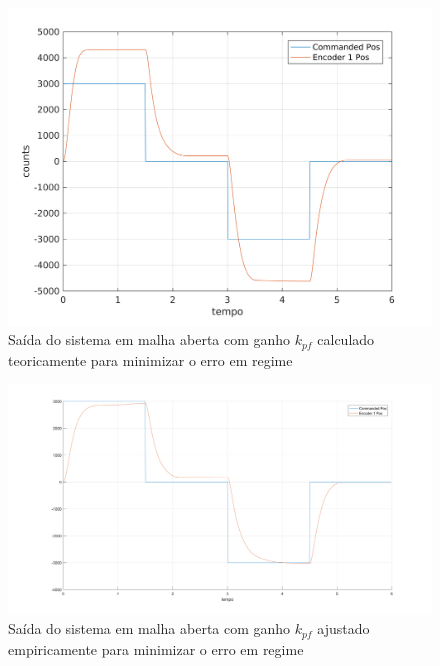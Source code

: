 \begin{figure}[H]
    \centering
    \includegraphics[width=.9\textwidth]{0_img/malha_aberta.png}
    \caption{Saída do sistema em malha aberta com ganho $k_{pf}$ calculado teoricamente para minimizar o erro em regime}
    \label{fig:aberta}
\end{figure}
\begin{figure}
    \centering
    \includegraphics[width=\textwidth]{0_img/malha_aberta_corrigida.png}
    \caption{Saída do sistema em malha aberta com ganho $k_{pf}$ ajustado empiricamente para minimizar o erro em regime}
    \label{fig:aberta_corrigida}
\end{figure}

